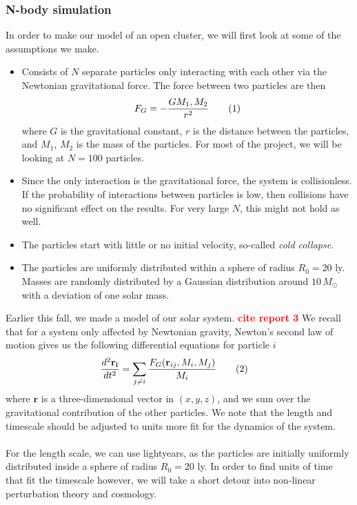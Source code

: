 \documentclass{article}
\newcommand\red[1]{\textcolor{red}{\textbf{#1}}}
\newcommand\numberthis{\addtocounter{equation}{1}\tag{\theequation}}
\begin{document}
\subsubsection{N-body simulation}
In order to make our model of an open cluster, we will first look at some of the assumptions we make.
\begin{itemize}
  \item Consists of $N$ separate particles only interacting with each other via the Newtonian gravitational force. The force between two particles are then
    \begin{align*}
      F_G = -\frac{G M_1, M_2}{r^2}\numberthis\label{eq:newton}
    \end{align*}
    where $G$ is the gravitational constant, $r$ is the distance between the particles, and $M_1$, $M_2$ is the mass of the particles. For most of the project, we will be looking at $N=100$ particles.
  \item Since the only interaction is the gravitational force, the system is collisionless. If the probability of interactions between particles is low, then collisions have no significant effect on the results. For very large $N$, this might not hold as well.
  \item The particles start with little or no initial velocity, so-called \textit{cold collapse}.
  \item The particles are uniformly distributed within a sphere of radius $R_0 = 20$ ly. Masses are randomly distributed by a Gaussian distribution around $10\,M_{\odot}$ with a deviation of one solar mass.
\end{itemize}
Earlier this fall, we made a model of our solar system. \red{cite report 3} We recall that for a system only affected by Newtonian gravity, Newton's second law of motion gives us the following differential equations for particle $i$
\begin{align*}
  \frac{d^2\mathbf{r_i}}{dt^2} &= \sum\limits_{j\neq i}\frac{F_G(\mathbf{r}_{ij}, M_i,M_j)}{M_i}\numberthis\label{eq:diff_eq}
\end{align*}
where $\mathbf{r}$ is a three-dimensional vector in $(x,y,z)$, and we sum over the gravitational contribution of the other particles. We note that the length and timescale should be adjusted to units more fit for the dynamics of the system.\\\\
For the length scale, we can use lightyears, as the particles are initially uniformly distributed inside a sphere of radius $R_0 = 20$ ly. In order to find units of time that fit the timescale however, we will take a short detour into non-linear perturbation theory and cosmology.
\end{document}
